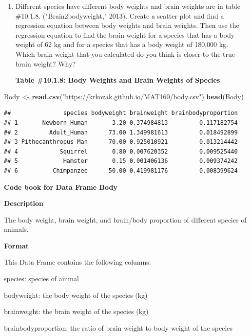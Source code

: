 \documentclass[]{book}
\newenvironment{Shaded}{\begin{snugshade}}{\end{snugshade}}
\newcommand{\KeywordTok}[1]{\textcolor[rgb]{0.13,0.29,0.53}{\textbf{#1}}}
\newcommand{\NormalTok}[1]{#1}
\newcommand{\StringTok}[1]{\textcolor[rgb]{0.31,0.60,0.02}{#1}}
\begin{document}
\begin{enumerate}
\def\labelenumi{\arabic{enumi}.}
\setcounter{enumi}{5}
\item
  Different species have different body weights and brain weights are in table \#10.1.8. ("Brain2bodyweight," 2013). Create a scatter plot and find a regression equation between body weights and brain weights. Then use the regression equation to find the brain weight for a species that has a body weight of 62 kg and for a species that has a body weight of 180,000 kg. Which brain weight that you calculated do you think is closer to the true brain weight? Why?

  \textbf{Table \#10.1.8: Body Weights and Brain Weights of Species}
\end{enumerate}

\begin{Shaded}
\begin{Highlighting}[]
\NormalTok{Body <-}\StringTok{ }\KeywordTok{read.csv}\NormalTok{(}\StringTok{"https://krkozak.github.io/MAT160/body.csv"}\NormalTok{)}
\KeywordTok{head}\NormalTok{(Body)}
\end{Highlighting}
\end{Shaded}

\begin{verbatim}
##               species bodyweight brainweight brainbodyproportion
## 1       Newborn_Human       3.20 0.374984813         0.117182754
## 2         Adult_Human      73.00 1.349981613         0.018492899
## 3 Pithecanthropus_Man      70.00 0.925010921         0.013214442
## 4            Squirrel       0.80 0.007620352         0.009525440
## 5             Hamster       0.15 0.001406136         0.009374242
## 6          Chimpanzee      50.00 0.419981176         0.008399624
\end{verbatim}

\textbf{Code book for Data Frame Body}

\textbf{Description}

The body weight, brain weight, and brain/body proportion of different species of animals.

\textbf{Format}

This Data Frame contains the following columns:

species: species of animal

bodyweight: the body weight of the species (kg)

brainweight: the brain weight of the species (kg)

brainbodyproportion: the ratio of brain weight to body weight of the species
\end{document}

